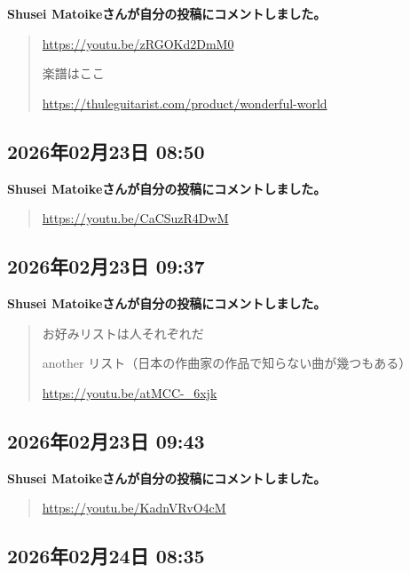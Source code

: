 \textbf{Shusei Matoikeさんが自分の投稿にコメントしました。}

\begin{quote}
\url{https://youtu.be/zRGOKd2DmM0}

楽譜はここ

\url{https://thuleguitarist.com/product/wonderful-world}
\end{quote}

\subsection*{2026年02月23日 08:50}

\textbf{Shusei Matoikeさんが自分の投稿にコメントしました。}

\begin{quote}
\url{https://youtu.be/CaCSuzR4DwM}
\end{quote}

\subsection*{2026年02月23日 09:37}

\textbf{Shusei Matoikeさんが自分の投稿にコメントしました。}

\begin{quote}
お好みリストは人それぞれだ

another リスト（日本の作曲家の作品で知らない曲が幾つもある）

\url{https://youtu.be/atMCC-_6xjk}
\end{quote}

\subsection*{2026年02月23日 09:43}

\textbf{Shusei Matoikeさんが自分の投稿にコメントしました。}

\begin{quote}
\url{https://youtu.be/KadnVRvO4cM}
\end{quote}

\subsection*{2026年02月24日 08:35}

